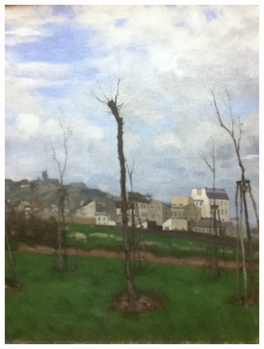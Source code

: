 \begin{figure}
\begin{minipage}[c]{.33\linewidth}
  \end{minipage}
  \begin{minipage}[c]{.32\linewidth}
  	\centering
    \includegraphics[width=\textwidth, angle=270]{figures/23D-1.JPG}
  \end{minipage}
  

\end{figure}
